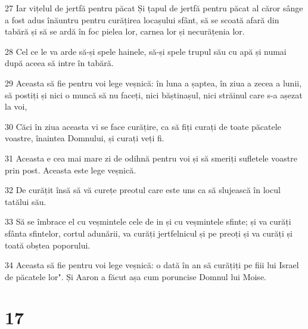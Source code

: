 \par 27 Iar vițelul de jertfă pentru păcat Și țapul de jertfă pentru păcat al căror sânge a fost adus înăuntru pentru curățirea locașului sfânt, să se scoată afară din tabără și să se ardă în foc pielea lor, carnea lor și necurățenia lor.
\par 28 Cel ce le va arde să-și spele hainele, să-și spele trupul său cu apă și numai după aceea să intre în tabără.
\par 29 Aceasta să fie pentru voi lege veșnică: în luna a șaptea, în ziua a zecea a lunii, să postiți și nici o muncă să nu faceți, nici băștinașul, nici străinul care s-a așezat la voi,
\par 30 Căci în ziua aceasta vi se face curățire, ca să fiți curați de toate păcatele voastre, înaintea Domnului, și curați veți fi.
\par 31 Aceasta e cea mai mare zi de odihnă pentru voi și să smeriți sufletele voastre prin post. Aceasta este lege veșnică.
\par 32 De curățit însă să vă curețe preotul care este uns ca să slujească în locul tatălui său.
\par 33 Să se îmbrace el cu veșmintele cele de in și cu veșmintele sfinte; și va curăți sfânta sfintelor, cortul adunării, va curăți jertfelnicul și pe preoți și va curăți și toată obștea poporului.
\par 34 Aceasta să fie pentru voi lege veșnică: o dată în an să curățiți pe fiii lui Israel de păcatele lor". Și Aaron a făcut așa cum poruncise Domnul lui Moise.

\chapter{17}

